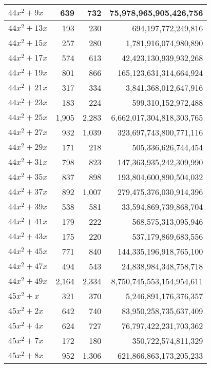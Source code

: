 \documentclass[a4paper]{amsproc}
\theoremstyle{plain}
\theoremstyle{named}
\begin{document}
\begin{longtable}{ | l | r | r | r | }
$44x^2 + 9x$ & 639 & 732 & 75{,}978{,}965{,}905{,}426{,}756 \\ \hline
$44x^2 + 13x$ & 193 & 230 & 694{,}197{,}772{,}249{,}816 \\ \hline
$44x^2 + 15x$ & 257 & 280 & 1{,}781{,}916{,}074{,}980{,}890 \\ \hline
$44x^2 + 17x$ & 574 & 613 & 42{,}423{,}130{,}939{,}932{,}268 \\ \hline
$44x^2 + 19x$ & 801 & 866 & 165{,}123{,}631{,}314{,}664{,}924 \\ \hline
$44x^2 + 21x$ & 317 & 334 & 3{,}841{,}368{,}012{,}647{,}916 \\ \hline
$44x^2 + 23x$ & 183 & 224 & 599{,}310{,}152{,}972{,}488 \\ \hline
$44x^2 + 25x$ & 1{,}905 & 2{,}283 & 6{,}662{,}017{,}304{,}818{,}303{,}765 \\ \hline
$44x^2 + 27x$ & 932 & 1{,}039 & 323{,}697{,}743{,}800{,}771{,}116 \\ \hline
$44x^2 + 29x$ & 171 & 218 & 505{,}336{,}626{,}744{,}454 \\ \hline
$44x^2 + 31x$ & 798 & 823 & 147{,}363{,}935{,}242{,}309{,}990 \\ \hline
$44x^2 + 35x$ & 837 & 898 & 193{,}804{,}600{,}890{,}504{,}032 \\ \hline
$44x^2 + 37x$ & 892 & 1{,}007 & 279{,}475{,}376{,}030{,}914{,}396 \\ \hline
$44x^2 + 39x$ & 538 & 581 & 33{,}594{,}869{,}739{,}868{,}704 \\ \hline
$44x^2 + 41x$ & 179 & 222 & 568{,}575{,}313{,}095{,}946 \\ \hline
$44x^2 + 43x$ & 175 & 220 & 537{,}179{,}869{,}683{,}556 \\ \hline
$44x^2 + 45x$ & 771 & 840 & 144{,}335{,}196{,}918{,}765{,}100 \\ \hline
$44x^2 + 47x$ & 494 & 543 & 24{,}838{,}984{,}348{,}758{,}718 \\ \hline
$44x^2 + 49x$ & 2{,}164 & 2{,}334 & 8{,}750{,}745{,}553{,}154{,}954{,}611 \\ \hline
$45x^2 + x$ & 321 & 370 & 5{,}246{,}891{,}176{,}376{,}357 \\ \hline
$45x^2 + 2x$ & 642 & 740 & 83{,}950{,}258{,}735{,}637{,}409 \\ \hline
$45x^2 + 4x$ & 624 & 727 & 76{,}797{,}422{,}231{,}703{,}362 \\ \hline
$45x^2 + 7x$ & 172 & 180 & 350{,}722{,}574{,}811{,}329 \\ \hline
$45x^2 + 8x$ & 952 & 1{,}306 & 621{,}866{,}863{,}173{,}205{,}233 \\ \hline

\end{longtable}
\end{document}
